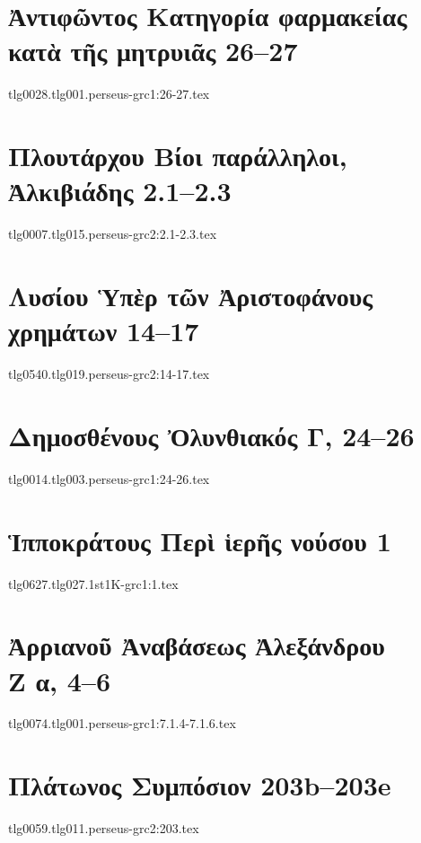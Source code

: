 \documentclass[a4paper,12pt,twoside]{report}
\begin{document}
\chapter[Ἀντιφῶντος Κατηγορία φαρμακείας\dots]{\textgreek[variant=ancient]{Ἀντιφῶντος Κατηγορία φαρμακείας κατὰ τῆς μητρυιᾶς} 26–27}
{tlg0028.tlg001.perseus-grc1:26-27.tex}

\chapter[Πλουτάρχου Ἀλκιβιάδης]{\textgreek[variant=ancient]{Πλουτάρχου Βίοι παράλληλοι, \\Ἀλκιβιάδης} 2.1–2.3}
{tlg0007.tlg015.perseus-grc2:2.1-2.3.tex}

\chapter[Λυσίου Ὑπὲρ τῶν Ἀριστοφάνους χρημάτων]{\textgreek[variant=ancient]{Λυσίου Ὑπὲρ τῶν Ἀριστοφάνους χρημάτων} 14–17}
{tlg0540.tlg019.perseus-grc2:14-17.tex}


\chapter[Δημοσθένους Ὀλυνθιακός Γ]{\textgreek[variant=ancient]{Δημοσθένους Ὀλυνθιακός Γ,} 24–26}
{tlg0014.tlg003.perseus-grc1:24-26.tex}

\chapter[Ἱπποκράτους Περὶ ἱερῆς νούσου]{\textgreek[variant=ancient]{Ἱπποκράτους Περὶ ἱερῆς νούσου} 1}
{tlg0627.tlg027.1st1K-grc1:1.tex}

\chapter[Ἀρριανοῦ Ἀναβάσεως Ἀλεξάνδρου Ζ]{\textgreek[variant=ancient]{Ἀρριανοῦ Ἀναβάσεως Ἀλεξάνδρου \\Ζ α,} 4–6}
{tlg0074.tlg001.perseus-grc1:7.1.4-7.1.6.tex}

\chapter[Πλάτωνος Συμπόσιον]{\textgreek[variant=ancient]{Πλάτωνος Συμπόσιον} 203b–203e}
{tlg0059.tlg011.perseus-grc2:203.tex}
\end{document}
